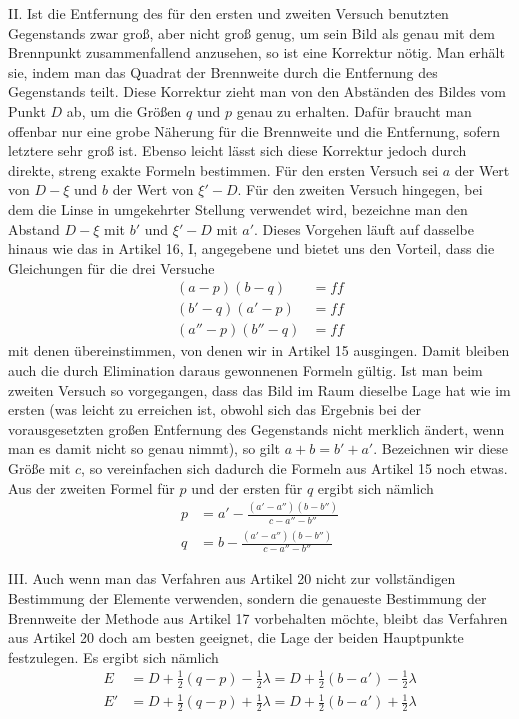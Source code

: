II. Ist die Entfernung des für den ersten und zweiten Versuch benutzten Gegenstands zwar groß, aber nicht groß genug, um sein Bild als genau mit dem Brennpunkt zusammenfallend anzusehen, so ist eine Korrektur nötig. Man erhält sie, indem man das Quadrat der Brennweite durch die Entfernung des Gegenstands teilt. Diese Korrektur zieht man von den Abständen des Bildes vom Punkt $D$ ab, um die Größen $q$ und $p$ genau zu erhalten. Dafür braucht man offenbar nur eine grobe Näherung für die Brennweite und die Entfernung, sofern letztere sehr groß ist. Ebenso leicht lässt sich diese Korrektur jedoch durch direkte, streng exakte Formeln bestimmen. Für den ersten Versuch sei $a$ der Wert von $D-\xi$ und $b$ der Wert von $\xi'-D$. Für den zweiten Versuch hingegen, bei dem die Linse in umgekehrter Stellung verwendet wird, bezeichne man den Abstand $D-\xi$ mit $b'$ und $\xi'-D$ mit $a'$. Dieses Vorgehen läuft auf dasselbe hinaus wie das in Artikel 16, I, angegebene und bietet uns den Vorteil, dass die Gleichungen für die drei Versuche
\[
\begin{aligned}
(a-p)(b-q)&=ff\\
(b'-q)(a'-p)&=ff\\
(a''-p)(b''-q)&=ff
\end{aligned}
\]
mit denen übereinstimmen, von denen wir in Artikel 15 ausgingen. Damit bleiben auch die durch Elimination daraus gewonnenen Formeln gültig. Ist man beim zweiten Versuch so vorgegangen, dass das Bild im Raum dieselbe Lage hat wie im ersten (was leicht zu erreichen ist, obwohl sich das Ergebnis bei der vorausgesetzten großen Entfernung des Gegenstands nicht merklich ändert, wenn man es damit nicht so genau nimmt), so gilt $a+b=b'+a'$. Bezeichnen wir diese Größe mit $c$, so vereinfachen sich dadurch die Formeln aus Artikel 15 noch etwas. Aus der zweiten Formel für $p$ und der ersten für $q$ ergibt sich nämlich
\[
\begin{aligned}
p&=a'-\frac{(a'-a'')(b-b'')}{c-a''-b''}\\
q&=b-\frac{(a'-a'')(b-b'')}{c-a''-b''}
\end{aligned}
\]

III. Auch wenn man das Verfahren aus Artikel 20 nicht zur vollständigen Bestimmung der Elemente verwenden, sondern die genaueste Bestimmung der Brennweite der Methode aus Artikel 17 vorbehalten möchte, bleibt das Verfahren aus Artikel 20 doch am besten geeignet, die Lage der beiden Hauptpunkte festzulegen. Es ergibt sich nämlich
\[
\begin{aligned}
E&=D+\tfrac12(q-p)-\tfrac12\lambda=D+\tfrac12(b-a')-\tfrac12\lambda\\
E'&=D+\tfrac12(q-p)+\tfrac12\lambda=D+\tfrac12(b-a')+\tfrac12\lambda
\end{aligned}
\]

